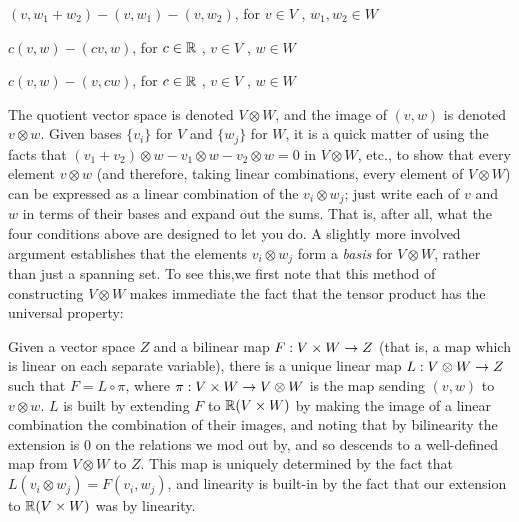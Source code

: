 $(v,w_1+w_2)-(v,w_1)-(v,w_2)$, for $v\in V$ , $w_1,w_2\in W$

$c(v,w)-(cv,w)$, for $c\in {\Bbb R}$ , $v\in V$ , $w\in W$

$c(v,w)-(v,cw)$, for $c\in {\Bbb R}$ , $v\in V$ , $w\in W$

\ssk

The quotient vector space is denoted $V\otimes W$, and the image of 
$(v,w)$ is denoted $v\otimes w$. Given bases $\{v_i\}$ for $V$
and $\{w_j\}$ for $W$, it is a quick matter of using the
facts that $(v_1+v_2)\otimes w-v_1\otimes w-v_2\otimes w=0$
in $V\otimes W$, etc., to show that every element 
$v\otimes w$ (and therefore, taking linear combinations,
every element of $V\otimes W$) can be expressed as a linear 
combination of the $v_i\otimes w_j$; just write each of $v$ and $w$
in terms of their bases and expand out the sums. That is, after all,
what the four conditions above are designed to let you do.
A slightly more involved argument establishes that the elements
$v_i\otimes w_j$ form a {\it basis} for $V\otimes W$, rather 
than just a spanning set. To see this,we first note that 
this method of constructing $V\otimes W$ makes immediate the
fact that the tensor product has the universal property:

\ssk

Given a vector space $Z$ and a bilinear map $F:V\times W\rightarrow Z$
(that is, a map which is linear on each separate variable),
there is a unique linear map $L:V\otimes W\rightarrow Z$ such that 
$F=L\circ \pi$, where $\pi:V\times W\rightarrow V\otimes W$ is the map
sending $(v,w)$ to $v\otimes w$. $L$ is built by extending 
$F$ to ${\Bbb R}(V\times W)$
by making the image of a linear combination the combination of their
images, and noting that by bilinearity the extension is $0$ on
the relations we mod out by, and so descends to a 
well-defined map from $V\otimes W$ to $Z$. This map is
uniquely determined by the fact that $L(v_i\otimes w_j)=F(v_i,w_j)$,
and linearity is built-in by the fact that our extension to 
${\Bbb R}(V\times W)$ was by linearity.

\ssk

